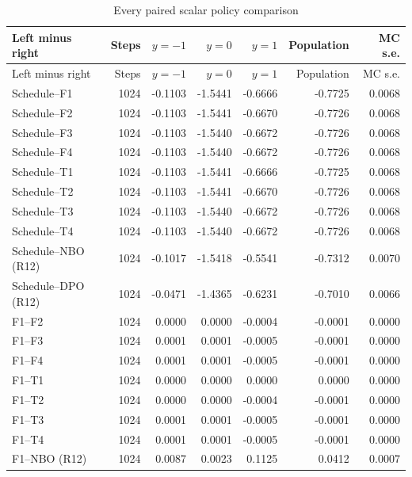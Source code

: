 \begingroup\small
\begin{longtable}{lrrrrrr}
\caption{Every paired scalar policy comparison}\label{tab:r15scalarpairs}\\
\toprule
Left minus right & Steps & $y=-1$ & $y=0$ & $y=1$ & Population & MC s.e. \\
\midrule
\endfirsthead
\toprule
Left minus right & Steps & $y=-1$ & $y=0$ & $y=1$ & Population & MC s.e. \\
\midrule
\endhead
Schedule--F1 & 1024 & -0.1103 & -1.5441 & -0.6666 & -0.7725 & 0.0068 \\
Schedule--F2 & 1024 & -0.1103 & -1.5441 & -0.6670 & -0.7726 & 0.0068 \\
Schedule--F3 & 1024 & -0.1103 & -1.5440 & -0.6672 & -0.7726 & 0.0068 \\
Schedule--F4 & 1024 & -0.1103 & -1.5440 & -0.6672 & -0.7726 & 0.0068 \\
Schedule--T1 & 1024 & -0.1103 & -1.5441 & -0.6666 & -0.7725 & 0.0068 \\
Schedule--T2 & 1024 & -0.1103 & -1.5441 & -0.6670 & -0.7726 & 0.0068 \\
Schedule--T3 & 1024 & -0.1103 & -1.5440 & -0.6672 & -0.7726 & 0.0068 \\
Schedule--T4 & 1024 & -0.1103 & -1.5440 & -0.6672 & -0.7726 & 0.0068 \\
Schedule--NBO (R12) & 1024 & -0.1017 & -1.5418 & -0.5541 & -0.7312 & 0.0070 \\
Schedule--DPO (R12) & 1024 & -0.0471 & -1.4365 & -0.6231 & -0.7010 & 0.0066 \\
F1--F2 & 1024 & 0.0000 & 0.0000 & -0.0004 & -0.0001 & 0.0000 \\
F1--F3 & 1024 & 0.0001 & 0.0001 & -0.0005 & -0.0001 & 0.0000 \\
F1--F4 & 1024 & 0.0001 & 0.0001 & -0.0005 & -0.0001 & 0.0000 \\
F1--T1 & 1024 & 0.0000 & 0.0000 & 0.0000 & 0.0000 & 0.0000 \\
F1--T2 & 1024 & 0.0000 & 0.0000 & -0.0004 & -0.0001 & 0.0000 \\
F1--T3 & 1024 & 0.0001 & 0.0001 & -0.0005 & -0.0001 & 0.0000 \\
F1--T4 & 1024 & 0.0001 & 0.0001 & -0.0005 & -0.0001 & 0.0000 \\
F1--NBO (R12) & 1024 & 0.0087 & 0.0023 & 0.1125 & 0.0412 & 0.0007 \\

\end{longtable}
